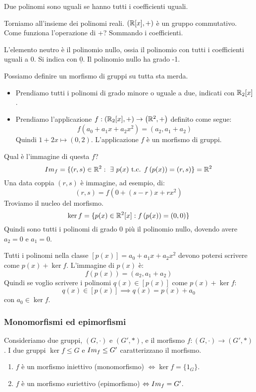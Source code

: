 \begin{defn}
Due polinomi sono uguali se hanno tutti i coefficienti uguali.
\end{defn}

Torniamo all'insieme dei polinomi reali. $\left( \mathbb{R}[x], + \right)$ \`e un gruppo commutativo. Come funziona l'operazione di +? Sommando i coefficienti. 

L'elemento neutro \`e il polinomio nullo, ossia il polinomio con tutti i coefficienti uguali a 0. Si indica con $\underline{0}$. Il polinomio nullo ha grado -1.

Possiamo definire un morfismo di gruppi su tutta sta merda.
\begin{itemize}
    \item Prendiamo tutti i polinomi di grado minore o uguale a due, indicati con $\mathbb{R}_2[x]$.
    \item Prendiamo l'applicazione $f : \left(\mathbb{R}_2[x], + \right) \to \left( \mathbb{R}^2, + \right)$ definito come segue:
    \[
    f \left( a_0 + a_1 x + a_2 x^2 \right) = \left( a_2, a_1 + a_2 \right)
    \]
    Quindi $1 + 2 x \mapsto (0, 2)$. L'applicazione $f$ \`e un morfismo di gruppi.
\end{itemize}
Qual \`e l'immagine di questa $f$? 
\[
\image{f} = \{ (r, s) \in \reals^2 : \exists p(x) \text{ t.c. } f \left( p(x) \right) = (r,s)\} = \reals^2
\]
Una data coppia $(r,s)$ \`e immagine, ad esempio, di:
\[
(r, s) = f(0 + (s - r) x + r x^2)
\]
Troviamo il nucleo del morfismo.
\[
\ker f = \{ p(x) \in \mathbb{R}^2[x] : f \left( p(x) \right) = (0, 0)\}
\]
Quindi sono tutti i polinomi di grado 0 pi\`u il polinomio nullo, dovendo avere $a_2 = 0$ e $a_1 = 0$.

Tutti i polinomi nella classe $[p(x)] = a_0 + a_1 x + a_2 x^2$ devono potersi scrivere come $p(x) + \ker f$. L'immagine di $p(x)$ \`e:
\[
f \left( p(x) \right) = (a_2, a_1 + a_2)
\]
Quindi se voglio scrivere i polinomi $q(x) \in [p(x)]$ come $p(x) + \ker f$:
\[
q(x) \in [p(x)] \implies q(x) = p(x) + a_0
\]
con $a_0 \in \ker f$.

\subsubsection{Monomorfismi ed epimorfismi}

Consideriamo due gruppi, $(G, \cdot)$ e $(G', \ast)$, e il morfismo $f : (G, \cdot) \to (G', \ast)$. I due gruppi $\ker f \le G$ e $Im_{f} \le G'$ caratterizzano il morfismo.
\begin{enumerate}
    \item\label{itm:monomorfismo} $f$ \`e un morfismo iniettivo (monomorfismo) $\iff \ker f = \{ 1_G\}$.
    \item\label{itm:epimorfismo} $f$ \`e un morfismo suriettivo (epimorfismo) $\Leftrightarrow Im_{f} = G'$.
\end{enumerate}

